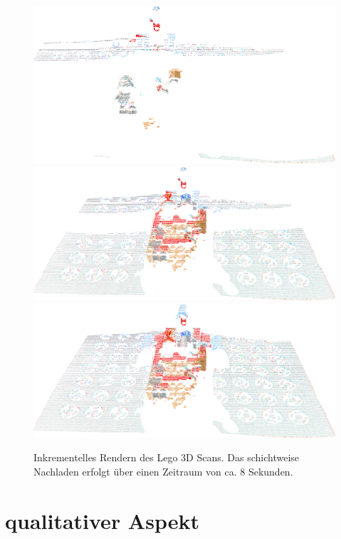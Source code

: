 \documentclass[hyperref, beleg, german]{cgvpub}
\begin{document}
\begin{figure}
	\centering
	\includegraphics[width = \linewidth]{images/Lego/126}
	\includegraphics[width = \linewidth]{images/Lego/150}
	\includegraphics[width = \linewidth]{images/Lego/170}
	\caption{Inkrementelles Rendern des Lego 3D Scans.
	Das schichtweise Nachladen erfolgt über einen Zeitraum von ca. 8 Sekunden.}%
	\label{img:lego}
\end{figure}

\section{qualitativer Aspekt}
\end{document}

